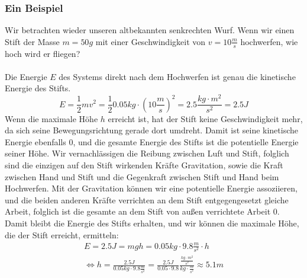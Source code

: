 \documentclass[11pt]{article}
\begin{document}
\subsubsection{Ein Beispiel}
Wir betrachten wieder unseren altbekannten senkrechten Wurf. Wenn wir einen Stift der Masse $m = 50g$ mit einer Geschwindigkeit von $v = 10 \frac{m}{s}$ hochwerfen, wie hoch wird er fliegen? \\\\
Die Energie $E$ des Systems direkt nach dem Hochwerfen ist genau die kinetische Energie des Stifts. 
\begin{equation*}
    E = \frac{1}{2}mv^2 = \frac{1}{2}0.05kg\cdot (10 \frac{m}{s})^2 = 2.5 \frac{kg\cdot m^2}{s^2} = 2.5 J
\end{equation*}
Wenn die maximale Höhe $h$ erreicht ist, hat der Stift keine Geschwindigkeit mehr, da sich seine Bewegungsrichtung gerade dort umdreht. Damit ist seine kinetische Energie ebenfalls $0$, und die gesamte Energie des Stifts ist die potentielle Energie seiner Höhe. Wir vernachlässigen die Reibung zwischen Luft und Stift, folglich sind die einzigen auf den Stift wirkenden Kräfte Gravitation, sowie die Kraft zwischen Hand und Stift und die Gegenkraft zwischen Stift und Hand beim Hochwerfen. Mit der Gravitation können wir eine potentielle Energie assoziieren, und die beiden anderen Kräfte verrichten an dem Stift entgegengesetzt gleiche Arbeit, folglich ist die gesamte an dem Stift von außen verrichtete Arbeit $0$. Damit bleibt die Energie des Stifts erhalten, und wir können die maximale Höhe, die der Stift erreicht, ermitteln: 
\begin{gather*}
    E = 2.5 J = mgh = 0.05kg \cdot 9.8 \frac{m}{s^2} \cdot h \\
    \iff h = \frac{2.5 J}{0.05kg \cdot 9.8 \frac{m}{s^2}} = \frac{2.5J}{0.05 \cdot 9.8} \frac{\frac{kg\cdot m^2}{s^2}}{kg\cdot\frac{m}{s^2}} \approx 5.1 m
\end{gather*}
\end{document}
